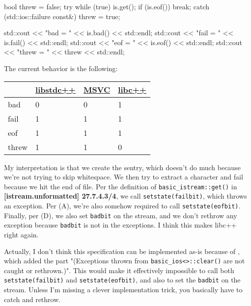 \documentclass{wg21}
\newcommand{\cc}[1]{\texttt{#1}}
\begin{document}
\begin{enumerate}
\begin{cpp}
{      bool threw = false;
      try {
          while (true) {
              is.get();
              if (is.eof())
                  break;
          }
      } catch (std::ios::failure const&) {
          threw = true;
      }

      std::cout << "bad = " << is.bad() << std::endl;
      std::cout << "fail = " << is.fail() << std::endl;
      std::cout << "eof = " << is.eof() << std::endl;
      std::cout << "threw = " << threw << std::endl;
  }
  \end{cpp}

  The current behavior is the following:
  \begin{center}
  \begin{tabular}{| l | l | l | l |}
  \hline
         & \href{https://wandbox.org/permlink/jSSGM6TcqLzZSl6M}{libstdc++}
         & \href{http://rextester.com/OPIJW60076}{MSVC}
         & \href{https://wandbox.org/permlink/O302uzC1VW0nW1Pn}{libc++} \\ \hline
  bad    & 0         & 0    & 1      \\ \hline
  fail   & 1         & 1    & 1      \\ \hline
  eof    & 1         & 1    & 1      \\ \hline
  threw  & 1         & 1    & 0      \\ \hline
  \end{tabular}
  \end{center}

  My interpretation is that we create the sentry, which doesn't do much because we're not trying to skip whitespace. We then try to extract a character and fail because we hit the end of file. Per the definition of \cc{basic_istream::get()} in \textbf{[istream.unformatted] 27.7.4.3/4}, we call \cc{setstate(failbit)}, which throws an exception. Per (A), we're also somehow required to call \cc{setstate(eofbit)}. Finally, per (D), we also set \cc{badbit} on the stream, and we don't rethrow any exception because \cc{badbit} is not in the exceptions. I think this makes libc++ right again.

  Actually, I don't think this specification can be implemented as-is because of \cite{LWG61}, which added the part "(Exceptions thrown from \cc{basic_ios<>::clear()} are not caught or rethrown.)". This would make it effectively impossible to call both \cc{setstate(failbit)} and \cc{setstate(eofbit)}, and also to set the \cc{badbit} on the stream. Unless I'm missing a clever implementation trick, you basically have to catch and rethrow.
\end{enumerate}
\end{document}
